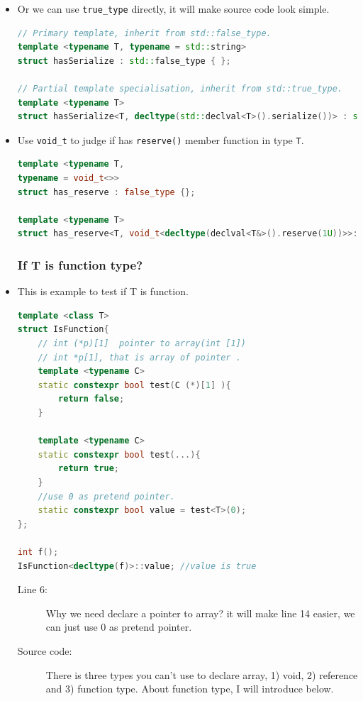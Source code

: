 \documentclass[a4paper,11pt,twoside]{book}
\begin{document}
\begin{itemize}
	\item Or we can use \texttt{true\_type} directly, it will make source code look simple.

\begin{lstlisting}[frame=single, language=c++]
// Primary template, inherit from std::false_type.
template <typename T, typename = std::string>
struct hasSerialize : std::false_type { };

// Partial template specialisation, inherit from std::true_type.
template <typename T>
struct hasSerialize<T, decltype(std::declval<T>().serialize())> : std::true_type { };
\end{lstlisting}

	\item Use \texttt{void\_t} to judge if has \texttt{reserve()} member function in type \texttt{T}.
\begin{lstlisting}[frame=single, language=c++]
template <typename T,
typename = void_t<>>
struct has_reserve : false_type {};

template <typename T>
struct has_reserve<T, void_t<decltype(declval<T&>().reserve(1U))>>: true_type {};
\end{lstlisting}
		


\subsubsection{ If T is function type? }

\item This is example to test if T is function.
\begin{lstlisting}[frame=single, language=c++]
template <class T>
struct IsFunction{
	// int (*p)[1]  pointer to array(int [1])
	// int *p[1], that is array of pointer .
	template <typename C> 
	static constexpr bool test(C (*)[1] ){
		return false;
	}
	
	template <typename C> 
	static constexpr bool test(...){
		return true;
	}
	//use 0 as pretend pointer.
	static constexpr bool value = test<T>(0);
};

int f();
IsFunction<decltype(f)>::value; //value is true 
\end{lstlisting}
\begin{description}
	\item[Line 6:] Why we need declare a pointer to array? it will make line 14 easier, we can just use 0 as pretend pointer.
	\item[Source code:] There is three types you can't use to declare array, 1) void, 2) reference and 3) function type.  About function type, I will introduce below. 
\end{description}


\end{itemize}
\end{document}
